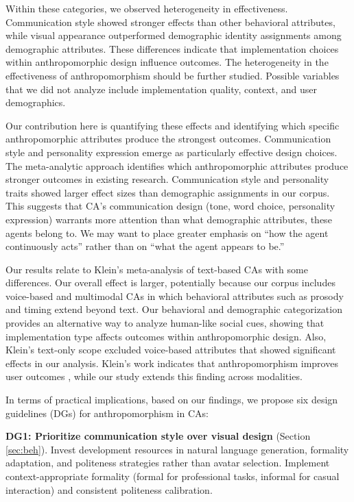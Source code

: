 \documentclass[sigconf,review,anonymous]{acmart}
\begin{document}
Within these categories, we observed heterogeneity in effectiveness. Communication style showed stronger effects than other behavioral attributes, while visual appearance outperformed demographic identity assignments among demographic attributes. These differences indicate that implementation choices within anthropomorphic design influence outcomes. The heterogeneity in the effectiveness of anthropomorphism should be further studied. Possible variables that we did not analyze include implementation quality, context, and user demographics.

Our contribution here is quantifying these effects and identifying which specific anthropomorphic attributes produce the strongest outcomes. Communication style and personality expression emerge as particularly effective design choices. The meta-analytic approach identifies which anthropomorphic attributes produce stronger outcomes in existing research. Communication style and personality traits showed larger effect sizes than demographic assignments in our corpus. This suggests that CA's communication design (tone, word choice, personality expression) warrants more attention than what demographic attributes, these agents belong to. We may want to place greater emphasis on  ``how the agent continuously acts'' rather than on ``what the agent appears to be.''

Our results relate to Klein's \cite{klein_effects_2025} meta-analysis of text-based CAs with some differences. Our overall effect is larger, potentially because our corpus includes voice-based and multimodal CAs in which behavioral attributes such as prosody and timing extend beyond text. Our behavioral and demographic categorization provides an alternative way to analyze human-like social cues, showing that implementation type affects outcomes within anthropomorphic design. Also, Klein's text-only scope excluded voice-based attributes that showed significant effects in our analysis. Klein's work indicates that anthropomorphism improves user outcomes \citep{klein_effects_2025}, while our study extends this finding across modalities.

In terms of practical implications, based on our findings, we propose six design guidelines (DGs) for anthropomorphism in CAs:

\textbf{DG1: Prioritize communication style over visual design} (Section \ref{sec:beh}). Invest development resources in natural language generation, formality adaptation, and politeness strategies rather than avatar selection. Implement context-appropriate formality (formal for professional tasks, informal for casual interaction) and consistent politeness calibration.
\end{document}
